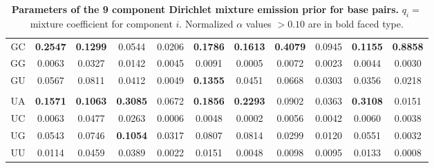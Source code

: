 \documentclass[11pt]{article}
\newif\ifdraft
\begin{document}
\begin{table}
\begin{center}
\begin{tabular}{|c|c|c|c|c|c|c|c|c|c|c|}
GC & \textbf{0.2547} & \textbf{0.1299} & 0.0544 & 0.0206 & \textbf{0.1786} & \textbf{0.1613} & \textbf{0.4079} & 0.0945 & \textbf{0.1155} & \textbf{0.8858} \\  
GG & 0.0063 & 0.0327 & 0.0142 & 0.0045 & 0.0091 & 0.0005 & 0.0072 & 0.0023 & 0.0044 & 0.0030 \\  
GU & 0.0567 & 0.0811 & 0.0412 & 0.0049 & \textbf{0.1355} & 0.0451 & 0.0668 & 0.0303 & 0.0356 & 0.0218 \\  
& & & & & & & & & & \\
UA & \textbf{0.1571} & \textbf{0.1063} & \textbf{0.3085} & 0.0672 & \textbf{0.1856} & \textbf{0.2293} & 0.0902 & 0.0363 & \textbf{0.3108} & 0.0151 \\  
UC & 0.0063 & 0.0477 & 0.0263 & 0.0006 & 0.0048 & 0.0002 & 0.0056 & 0.0042 & 0.0060 & 0.0038 \\  
UG & 0.0543 & 0.0746 & \textbf{0.1054} & 0.0317 & 0.0807 & 0.0814 & 0.0299 & 0.0120 & 0.0551 & 0.0032 \\  
UU & 0.0114 & 0.0459 & 0.0389 & 0.0022 & 0.0151 & 0.0048 & 0.0098 & 0.0095 & 0.0133 & 0.0008 \\ \hline 
\end{tabular}
\end{center}

\normalfont\rmfamily
\caption{\textbf{Parameters of the 9 component Dirichlet mixture
    emission prior for base pairs.} $q_i =$ mixture coefficient for
    component $i$. Normalized $\alpha$ values $> 0.10$ are in bold
    faced type.}
\label{tbl:basepairs}
\end{table}
\fi
\ifdraft
\end{document}
